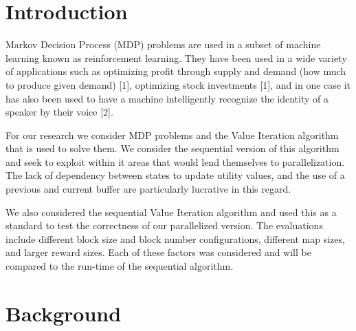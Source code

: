 \documentclass[letterpaper,twocolumn,10pt]{article}
\begin{document}

{%



\noindent {}

\section{Introduction}

Markov Decision Process (MDP) problems are used in a subset of machine learning known as reinforcement learning. They have been used in a wide variety of applications such as optimizing profit through supply and demand (how much to produce given demand) [1], optimizing stock investments [1], and in one case it has also been used to have a machine intelligently recognize the identity of a speaker by their voice [2]. 

For our research we consider MDP problems and the Value Iteration algorithm that is used to solve them. We consider the sequential version of this algorithm and seek to exploit within it areas that would lend themselves to parallelization. The lack of dependency between states to update utility values, and the use of a previous and current buffer are particularly lucrative in this regard.

We also considered the sequential Value Iteration algorithm and used this as a standard to test the correctness of our parallelized version. The evaluations include different block size and block number configurations, different map sizes, and larger reward sizes. Each of these factors was considered and will be compared to the run-time of the sequential algorithm.


\section{Background}

}
\end{document}
